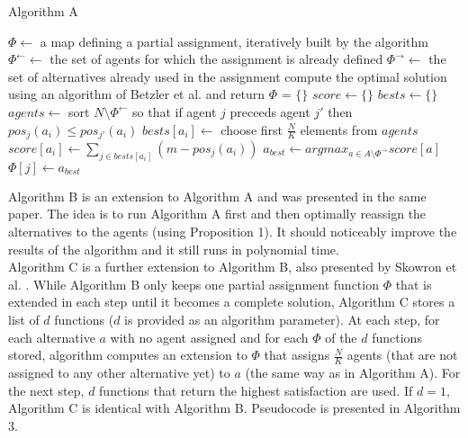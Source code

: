 \begin{algorithm}
\caption{Algorithm A}\label{euclid}
\begin{algorithmic}[1]
		\State $\Phi \gets$ a map defining a partial assignment, iteratively built by the algorithm
		\State $\Phi^{\leftarrow} \gets$ the set of agents for which the assignment is already defined
		\State $\Phi^{\rightarrow} \gets$ the set of alternatives already used in the assignment
			\State compute the optimal solution using an algorithm of Betzler et al. \cite{1} and return
		\EndIf
		\State $\Phi$ = $\{\}$
			\State $score \gets \{\}$
			\State $bests \gets \{\}$
				\State $agents \gets$ sort $N \setminus \Phi^{\leftarrow}$ so that if agent $j$ preceeds agent $j'$ then $pos_{j}(a_{i}) \leq pos_{j'}(a_{i})$
				\State $bests[a_{i}] \gets$ choose first $\frac{N}{K}$ elements from $agents$
				\State $score[a_{i}] \gets \sum_{j \in bests[a_{i}]}(m - pos_{j}(a_{i}))$
			\EndFor
			\State $a_{best} \gets argmax_{a \in A \setminus \Phi^{\rightarrow}} score[a]$
				\State $\Phi[j] \gets a_{best}$
			\EndFor
		\EndFor
	\EndProcedure
\end{algorithmic}
\end{algorithm}

Algorithm B is an extension to Algorithm A and was presented in the same paper. \cite{1} The idea is to run Algorithm A first and then optimally reassign the alternatives to the agents (using Proposition 1). It should noticeably improve the results of the algorithm and it still runs in polynomial time.
\\

Algorithm C is a further extension to Algorithm B, also presented by Skowron et al. \cite{1}. While Algorithm B only keeps one partial assignment function $\Phi$ that is extended in each step until it becomes a complete solution, Algorithm C stores a list of $d$ functions ($d$ is provided as an algorithm parameter). At each step, for each alternative $a$ with no agent assigned and for each $\Phi$ of the $d$ functions stored, algorithm computes an extension to $\Phi$ that assigns $\frac{N}{K}$ agents (that are not assigned to any other alternative yet) to $a$ (the same way as in Algorithm A). For the next step, $d$ functions that return the highest satisfaction are used. If $d = 1$, Algorithm C is identical with Algorithm B. Pseudocode is presented in Algorithm 3.
\\

